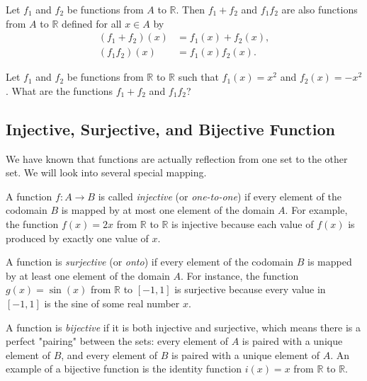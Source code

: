 \documentclass[
	12pt, %
	fleqn, %
	a4paper, %
]{LegrandOrangeBook}
\begin{document}
\begin{theorem}
Let \( f_1 \) and \( f_2 \) be functions from \( A \) to \( \mathbb{R} \). Then \( f_1 + f_2 \) and \( f_1f_2 \) are also functions from \( A \) to \( \mathbb{R} \) defined for all \( x \in A \) by
\begin{align*}
    (f_1 + f_2)(x) &= f_1(x) + f_2(x), \\
    (f_1f_2)(x) &= f_1(x)f_2(x).
\end{align*}
\end{theorem}
\begin{problem}
    Let \( f_1 \) and \( f_2 \) be functions from \( \mathbb{R} \) to \( \mathbb{R} \) such that \( f_1(x) = x^2 \) and \( f_2(x) = -x^2 \). What are the functions \( f_1 + f_2 \) and \( f_1f_2 \)?
\end{problem}

\subsection{Injective, Surjective, and Bijective Function}
We have known that functions are actually reflection from one set to the other set. We will look into several special mapping.

\begin{definition}
    A function \( f: A \to B \) is called \emph{injective} (or \emph{one-to-one}) if every element of the codomain \( B \) is mapped by at most one element of the domain \( A \). For example, the function \( f(x) = 2x \) from \( \mathbb{R} \) to \( \mathbb{R} \) is injective because each value of \( f(x) \) is produced by exactly one value of \( x \).
\end{definition}

\begin{definition}
    A function is \emph{surjective} (or \emph{onto}) if every element of the codomain \( B \) is mapped by at least one element of the domain \( A \). For instance, the function \( g(x) = \sin(x) \) from \( \mathbb{R} \) to \( [-1, 1] \) is surjective because every value in \( [-1, 1] \) is the sine of some real number \( x \).
\end{definition}

\begin{definition}
    A function is \emph{bijective} if it is both injective and surjective, which means there is a perfect "pairing" between the sets: every element of \( A \) is paired with a unique element of \( B \), and every element of \( B \) is paired with a unique element of \( A \). An example of a bijective function is the identity function \( i(x) = x \) from \( \mathbb{R} \) to \( \mathbb{R} \).
\end{definition}
\end{document}
